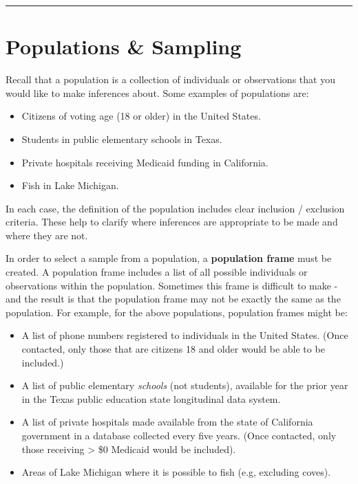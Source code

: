 \documentclass[
  letterpaper,
  DIV=11,
  numbers=noendperiod]{scrreprt}
\providecommand{\tightlist}{%
  \setlength{\itemsep}{0pt}\setlength{\parskip}{0pt}}\usepackage{longtable,booktabs,array}
\theoremstyle{definition}
\theoremstyle{remark}
\begin{document}
\begin{center}\rule{0.5\linewidth}{0.5pt}\end{center}

\hypertarget{sample-selection}{%
\section{Populations \& Sampling}\label{sample-selection}}

Recall that a population is a collection of individuals or observations
that you would like to make inferences about. Some examples of
populations are:

\begin{itemize}
\tightlist
\item
  Citizens of voting age (18 or older) in the United States.
\item
  Students in public elementary schools in Texas.
\item
  Private hospitals receiving Medicaid funding in California.
\item
  Fish in Lake Michigan.
\end{itemize}

In each case, the definition of the population includes clear inclusion
/ exclusion criteria. These help to clarify where inferences are
appropriate to be made and where they are not.

In order to select a sample from a population, a \textbf{population
frame} must be created. A population frame includes a list of all
possible individuals or observations within the population. Sometimes
this frame is difficult to make - and the result is that the population
frame may not be exactly the same as the population. For example, for
the above populations, population frames might be:

\begin{itemize}
\tightlist
\item
  A list of phone numbers registered to individuals in the United
  States. (Once contacted, only those that are citizens 18 and older
  would be able to be included.)
\item
  A list of public elementary \emph{schools} (not students), available
  for the prior year in the Texas public education state longitudinal
  data system.
\item
  A list of private hospitals made available from the state of
  California government in a database collected every five years. (Once
  contacted, only those receiving \textgreater{} \$0 Medicaid would be
  included).
\item
  Areas of Lake Michigan where it is possible to fish (e.g, excluding
  coves).
\end{itemize}
\end{document}
